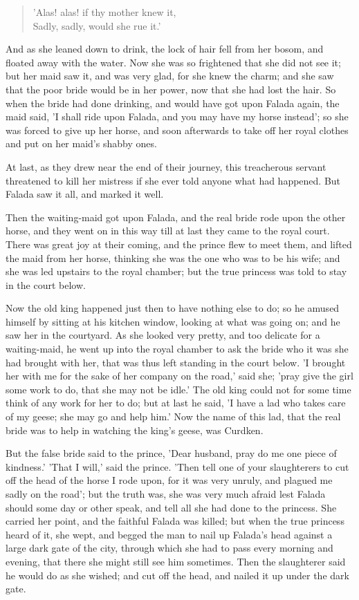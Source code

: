 \documentclass[12pt]{book}
\begin{document}
\begin{verse}
 'Alas! alas! if thy mother knew it,\\
  Sadly, sadly, would she rue it.'
\end{verse}

And as she leaned down to drink, the lock of hair fell from her bosom,
and floated away with the water. Now she was so frightened that she
did not see it; but her maid saw it, and was very glad, for she knew
the charm; and she saw that the poor bride would be in her power, now
that she had lost the hair. So when the bride had done drinking, and
would have got upon Falada again, the maid said, 'I shall ride upon
Falada, and you may have my horse instead'; so she was forced to give
up her horse, and soon afterwards to take off her royal clothes and
put on her maid's shabby ones.

At last, as they drew near the end of their journey, this treacherous
servant threatened to kill her mistress if she ever told anyone what
had happened. But Falada saw it all, and marked it well.

Then the waiting-maid got upon Falada, and the real bride rode upon
the other horse, and they went on in this way till at last they came
to the royal court. There was great joy at their coming, and the
prince flew to meet them, and lifted the maid from her horse, thinking
she was the one who was to be his wife; and she was led upstairs to
the royal chamber; but the true princess was told to stay in the court
below.

Now the old king happened just then to have nothing else to do; so he
amused himself by sitting at his kitchen window, looking at what was
going on; and he saw her in the courtyard. As she looked very pretty,
and too delicate for a waiting-maid, he went up into the royal chamber
to ask the bride who it was she had brought with her, that was thus
left standing in the court below. 'I brought her with me for the sake
of her company on the road,' said she; 'pray give the girl some work
to do, that she may not be idle.' The old king could not for some time
think of any work for her to do; but at last he said, 'I have a lad
who takes care of my geese; she may go and help him.' Now the name of
this lad, that the real bride was to help in watching the king's
geese, was Curdken.

But the false bride said to the prince, 'Dear husband, pray do me one
piece of kindness.' 'That I will,' said the prince. 'Then tell one of
your slaughterers to cut off the head of the horse I rode upon, for it
was very unruly, and plagued me sadly on the road'; but the truth was,
she was very much afraid lest Falada should some day or other speak,
and tell all she had done to the princess. She carried her point, and
the faithful Falada was killed; but when the true princess heard of
it, she wept, and begged the man to nail up Falada's head against a
large dark gate of the city, through which she had to pass every
morning and evening, that there she might still see him sometimes.
Then the slaughterer said he would do as she wished; and cut off the
head, and nailed it up under the dark gate.
\end{document}
